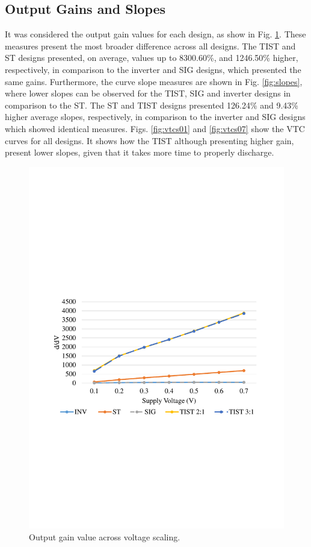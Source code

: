 \documentclass[pgmicro,mestrado,english]{iiufrgs}
\begin{document}
\subsection{Output Gains and Slopes}

It was considered the output gain values for each design, as show in Fig. \ref{figsGainComp}. These measures present the most broader difference across all designs. The TIST and ST designs presented, on average, values up to 8300.60\%, and 1246.50\% higher, respectively, in comparison to the inverter and SIG designs, which presented the same gains. Furthermore, the curve slope measures are shown in Fig. \ref{fig:slopes}, where lower slopes can be observed for the TIST, SIG and inverter designs in comparison to the ST. The ST and TIST designs presented 126.24\% and 9.43\% higher average slopes, respectively, in comparison to the inverter and SIG designs which showed identical measures. Figs. \ref{fig:vtcs01} and \ref{fig:vtcs07} show the VTC curves for all designs. It shows how the TIST although presenting higher gain, present lower slopes, given that it takes more time to properly discharge.

    \begin{figure}[]
        \centering
            \includegraphics[width=1\textwidth, trim={1.25cm 9cm 2cm 10cm}, clip]{gainComp.pdf}
            \caption{Output gain value across voltage scaling.}
        \label{figsGainComp}
    \end{figure}
\end{document}
